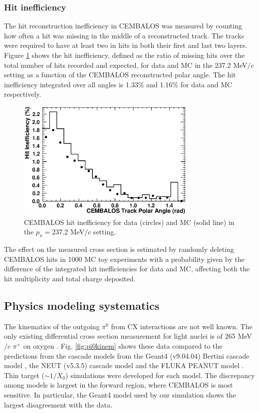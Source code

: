 \subsubsection{\bf Hit inefficiency}
The hit reconstruction inefficiency in CEMBALOS was measured by counting how often a hit was missing in the middle of a reconstructed track. The tracks were required to have at least two in hits in both their first and last two layers. Figure \ref{fig:hit_ineff} shows the hit inefficiency, defined as the ratio of missing hits over the total number of hits recorded and expected, for data and MC in the 237.2 MeV$/c$ setting as a function of the CEMBALOS reconstructed polar angle. The hit inefficiency integrated over all angles is 1.33\% and 1.16\% for data and MC respectively.
\begin{figure}[ht]
 \includegraphics[width=86mm]{figures/cembalos_hit_ineff_237.eps}
 \caption{CEMBALOS hit inefficiency for data (circles) and MC (solid line) in the $p_\pi=$237.2 MeV$/c$ setting.}
 \label{fig:hit_ineff}
\end{figure}

The effect on the measured cross section is estimated by randomly deleting CEMBALOS hits in 1000 MC toy experiments with a probability given by the difference of the integrated hit inefficiencies for data and MC, affecting both the hit multiplicity and total charge deposited.

\subsection{Physics modeling systematics}\label{physics_syst}
The kinematics of the outgoing $\pi^0$ from CX interactions are not well known. The only existing differential cross section measurement for light nuclei is of 265 MeV$/c$ $\pi^{+}$ on oxygen \cite{Ashery2}. Fig. \ref{fig:pi0kinem} shows these data compared to the predictions from the cascade models from the Geant4 (v9.04.04) Bertini cascade model \cite{bertini}, the NEUT (v5.3.5) cascade model \cite{NEUT} and the FLUKA PEANUT model \cite{fluka1,fluka2}. Thin target ($\sim1/X_{0}$) simulations were developed for each model. The discrepancy among models is largest in the forward region, where CEMBALOS is most sensitive. In particular, the Geant4 model used by our simulation shows the largest disagreement with the data. 

